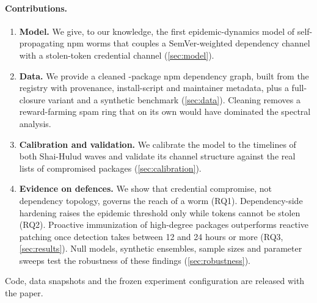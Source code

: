 \paragraph{Contributions.}
\begin{enumerate}
  \item \textbf{Model.} We give, to our knowledge, the first epidemic-dynamics model of self-propagating
        npm worms that couples a SemVer-weighted dependency channel with a stolen-token credential
        channel (\cref{sec:model}).
  \item \textbf{Data.} We provide a cleaned \MainN-package npm dependency graph, built from the
        registry with provenance, install-script and maintainer metadata, plus a full-closure variant
        and a synthetic benchmark (\cref{sec:data}). Cleaning removes a reward-farming spam ring that
        on its own would have dominated the spectral analysis.
  \item \textbf{Calibration and validation.} We calibrate the model to the timelines of both Shai-Hulud
        waves and validate its channel structure against the real lists of compromised packages
        (\cref{sec:calibration}).
  \item \textbf{Evidence on defences.} We show that credential compromise, not dependency topology,
        governs the reach of a worm (RQ1). Dependency-side hardening raises the epidemic threshold only
        while tokens cannot be stolen (RQ2). Proactive immunization of high-degree packages
        outperforms reactive patching once detection takes between 12 and 24 hours or more (RQ3,
        \cref{sec:results}). Null models, synthetic ensembles, sample sizes and parameter sweeps test
        the robustness of these findings (\cref{sec:robustness}).
\end{enumerate}
Code, data snapshots and the frozen experiment configuration are released with the paper.
